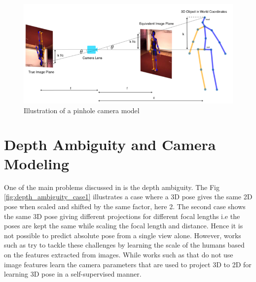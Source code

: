 \begin{figure}[h]
    \centering
    \includegraphics[width=\textwidth]{figures/background/pinhole.png}
    \caption{Illustration of a pinhole camera model}
    \label{fig:pinhole}
\end{figure}

\section{Depth Ambiguity and Camera Modeling}
\label{sec:depth_ambiguity_camera_modeling}
One of the main problems discussed in  is the depth ambiguity. The Fig \ref{fig:depth_ambiguity_case1} illustrates a case where a 3D pose gives the same 2D pose when scaled and shifted by the same factor, here 2. The second case shows the same 3D pose giving different projections for different focal lengths i.e the poses are kept the same while scaling the focal length and distance. Hence it is not possible to predict absolute pose from a single view alone. However, works such as \cite{CameraDistanceAware} try to tackle these challenges by learning the scale of the humans based on the features extracted from images. While works such as \cite{repnet,weaklymultiple} that do not use image features learn the camera parameters that are used to project 3D to 2D for learning 3D pose in a self-supervised manner. 

